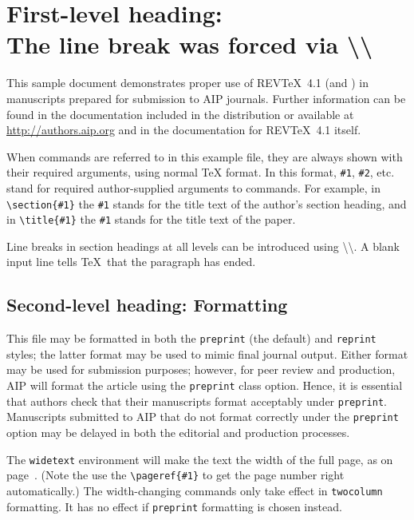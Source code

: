 \documentclass[%
 aip,
 jmp,%
 amsmath,amssymb,
 reprint,%
]{revtex4-1}
\begin{document}
\section{\label{sec:level1}First-level heading:\protect\\ The line
break was forced \lowercase{via} \textbackslash\textbackslash}

This sample document demonstrates proper use of REV\TeX~4.1 (and
\LaTeXe) in manuscripts prepared for submission to AIP
journals. Further information can be found in the documentation included in the distribution or available at
\url{http://authors.aip.org} and in the documentation for 
REV\TeX~4.1 itself.

When commands are referred to in this example file, they are always
shown with their required arguments, using normal \TeX{} format. In
this format, \verb+#1+, \verb+#2+, etc. stand for required
author-supplied arguments to commands. For example, in
\verb+\section{#1}+ the \verb+#1+ stands for the title text of the
author's section heading, and in \verb+\title{#1}+ the \verb+#1+
stands for the title text of the paper.

Line breaks in section headings at all levels can be introduced using
\textbackslash\textbackslash. A blank input line tells \TeX\ that the
paragraph has ended. 

\subsection{\label{sec:level2}Second-level heading: Formatting}

This file may be formatted in both the \texttt{preprint} (the default) and
\texttt{reprint} styles; the latter format may be used to 
mimic final journal output. Either format may be used for submission
purposes; however, for peer review and production, AIP will format the
article using the \texttt{preprint} class option. Hence, it is
essential that authors check that their manuscripts format acceptably
under \texttt{preprint}. Manuscripts submitted to AIP that do not
format correctly under the \texttt{preprint} option may be delayed in
both the editorial and production processes.

The \texttt{widetext} environment will make the text the width of the
full page, as on page~\pageref{eq:wideeq}. (Note the use the
\verb+\pageref{#1}+ to get the page number right automatically.) The
width-changing commands only take effect in \texttt{twocolumn}
formatting. It has no effect if \texttt{preprint} formatting is chosen
instead.
\end{document}
